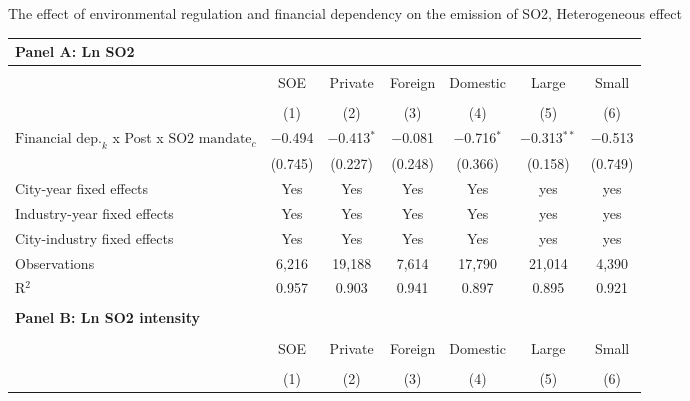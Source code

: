 \documentclass[
  convert={
    density=800 -alpha deactivate,
    size=1080x800,
    outext=.png
  },
]{standalone}
\begin{document}
\centering              
\begin{adjustbox}{varwidth=\maxdimen,max width=\linewidth}
\begin{threeparttable}   
  \caption{\small The effect of environmental regulation and financial dependency on the emission of SO2, Heterogeneous effect}

  \begin{tabular}{l*{6}{c}}
    
    \multicolumn{1}{l}{\textbf{Panel A: Ln SO2}} \\
    
    \toprule
     
    & \multicolumn{6}{c}{} \\ 
    \hline
    & \multicolumn{1}{c}{SOE} & \multicolumn{1}{c}{Private}
    & \multicolumn{1}{c}{Foreign} & \multicolumn{1}{c}{Domestic}
    & \multicolumn{1}{c}{Large}& \multicolumn{1}{c}{Small}
    \\ 
    \\[-1.8ex] & (1) & (2) & (3) & (4) & (5) & (6)  \\ 
    \hline    
    $\text{Financial dep.}_k$ x Post x $\text{SO2 mandate}_c$ & $-$0.494 & $-$0.413$^{*}$ & $-$0.081 & $-$0.716$^{*}$  & $-$0.313$^{**}$ & $-$0.513 \\ 
  & (0.745)& (0.227) & (0.248)&(0.366)  & (0.158) & (0.749) \\  
    \midrule
    City-year fixed effects & Yes & Yes & Yes & Yes & yes & yes \\ 
    Industry-year fixed effects & Yes & Yes & Yes & Yes & yes & yes \\ 
    City-industry fixed effects & Yes & Yes & Yes & Yes & yes & yes \\ 
    Observations & 6,216& 19,188 & 7,614 & 17,790  & 21,014 & 4,390 \\ 
    R$^{2}$ & 0.957 & 0.903 & 0.941 & 0.897 & 0.895 & 0.921 \\  
    \bottomrule     
    \\ %
    
    \multicolumn{1}{l}{\textbf{Panel B: Ln SO2 intensity}} \\
    \toprule
    
    & \multicolumn{6}{c}{} \\ 
    \hline
    & \multicolumn{1}{c}{SOE} & \multicolumn{1}{c}{Private}
    & \multicolumn{1}{c}{Foreign} & \multicolumn{1}{c}{Domestic}
    & \multicolumn{1}{c}{Large}& \multicolumn{1}{c}{Small}
    \\ 
    \\[-1.8ex] & (1) & (2) & (3) & (4) & (5) & (6)  \\ 
    \hline 
      

\end{tabular}
\end{threeparttable}
\end{adjustbox}
\end{document}

